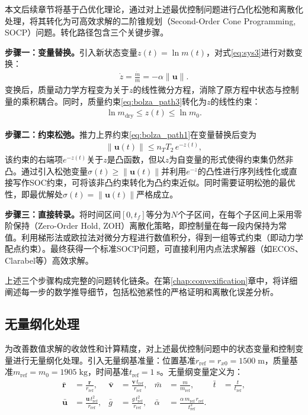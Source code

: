 本文后续章节将基于凸优化理论，通过对上述最优控制问题进行凸化松弛和离散化处理，将其转化为可高效求解的二阶锥规划（Second-Order Cone Programming, SOCP）问题。转化路径包含三个关键步骤。

\textbf{步骤一：变量替换。}引入新状态变量$z(t) = \ln m(t)$，对式\eqref{eq:sys3}进行对数变换：
\begin{align}
    \dot{z} = \frac{\dot{m}}{m} = -\alpha\|\bm{u}\|. \label{eq:log_mass}
\end{align}
变换后，质量动力学方程变为关于$z$的线性微分方程，消除了原方程中状态与控制量的乘积耦合。同时，质量约束\eqref{eq:bolza_path3}转化为$z$的线性约束：
\begin{align}
    \ln m_{\mathrm{dry}} \leq z(t) \leq \ln m_0.
\end{align}

\textbf{步骤二：约束松弛。}推力上界约束\eqref{eq:bolza_path1}在变量替换后变为
\begin{align}
    \|\bm{u}(t)\| \leq n_T T_2\,e^{-z(t)},
\end{align}
该约束的右端项$e^{-z(t)}$关于$z$是凸函数，但以$z$为自变量的形式使得约束集仍然非凸。通过引入松弛变量$\sigma(t) \geq \|\bm{u}(t)\|$并利用$e^{-z}$的凸性进行序列线性化或直接写作SOC约束，可将该非凸约束转化为凸约束近似。同时需要证明松弛的最优性，即最优解处$\sigma(t) = \|\bm{u}(t)\|$严格成立。

\textbf{步骤三：直接转录。}将时间区间$[0, t_f]$等分为$N$个子区间，在每个子区间上采用零阶保持（Zero-Order Hold, ZOH）离散化策略，即控制量在每一段内保持为常值。利用梯形法或欧拉法对微分方程进行数值积分，得到一组等式约束（即动力学配点约束）。最终获得一个标准SOCP问题，可直接利用内点法求解器（如ECOS、Clarabel等）高效求解。

上述三个步骤构成完整的问题转化链条。在第\ref{chap:convexification}章中，将详细阐述每一步的数学推导细节，包括松弛紧性的严格证明和离散化误差分析。

\subsection{无量纲化处理}

为改善数值求解的收敛性和计算精度，对上述最优控制问题中的状态变量和控制变量进行无量纲化处理。引入无量纲基准量：位置基准$r_{\mathrm{ref}} = r_{x0} = 1500\;\mathrm{m}$，质量基准$m_{\mathrm{ref}} = m_0 = 1905\;\mathrm{kg}$，时间基准$t_{\mathrm{ref}} = 1\;\mathrm{s}$。无量纲变量定义为：
\begin{align}
    \bar{\bm{r}} &= \frac{\bm{r}}{r_{\mathrm{ref}}}, &
    \bar{\bm{v}} &= \frac{\bm{v}\,t_{\mathrm{ref}}}{r_{\mathrm{ref}}}, &
    \bar{m}      &= \frac{m}{m_{\mathrm{ref}}}, &
    \bar{t}      &= \frac{t}{t_{\mathrm{ref}}}, \\
    \bar{\bm{u}} &= \frac{\bm{u}\,t_{\mathrm{ref}}^2}{r_{\mathrm{ref}}}, &
    \bar{g}      &= \frac{g\,t_{\mathrm{ref}}^2}{r_{\mathrm{ref}}}, &
    \bar{\alpha} &= \frac{\alpha\,m_{\mathrm{ref}}\,r_{\mathrm{ref}}}{t_{\mathrm{ref}}^2}.
\end{align}

